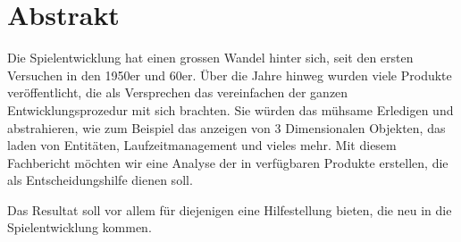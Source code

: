 

\cleardoublepage
\chapter*{Abstrakt}
Die Spielentwicklung hat einen grossen Wandel hinter sich, seit den ersten Versuchen in den 1950er und 60er. Über die Jahre hinweg wurden viele Produkte veröffentlicht, die als Versprechen das vereinfachen der
ganzen Entwicklungsprozedur mit sich brachten. Sie würden das mühsame Erledigen und abstrahieren, wie zum Beispiel das anzeigen von 3 Dimensionalen Objekten, das laden von Entitäten, Laufzeitmanagement und vieles mehr. Mit diesem Fachbericht möchten wir eine Analyse der in \the\year verfügbaren Produkte erstellen, die als Entscheidungshilfe dienen soll. \\
\par Das Resultat soll vor allem für diejenigen eine Hilfestellung bieten, die neu in die Spielentwicklung kommen.



